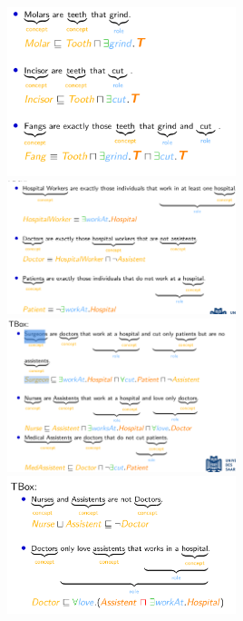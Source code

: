 \documentclass[conference]{styles/acmsiggraph}
\begin{document}
\includegraphics[width=0.5\textwidth]{imgs/tbox5.png}
\includegraphics[width=0.5\textwidth]{imgs/tbox6.png}\\
\includegraphics[width=0.5\textwidth]{imgs/tbox7.png}
\includegraphics[width=0.5\textwidth]{imgs/tbox8.png}\\
\end{document}

